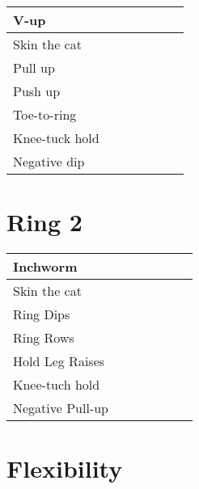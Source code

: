 \documentclass{article}
\begin{document}
\begin{landscape}
\noindent\begin{tabularx}{\columnwidth}{ |l|*{6}{R|} }
  \hline
  V-up                             &&&&&&    \\
  \hline
  Skin the cat                     &&&&&&    \\
  \hline
  Pull up                          &&&&&&    \\
  \hline
  Push up                          &&&&&&    \\
  \hline
  Toe-to-ring                      &&&&&&    \\
  \hline
  Knee-tuck hold                   &&&&&&    \\
  \hline
  Negative dip                     &&&&&&    \\
  \hline
\end{tabularx}



\section*{Ring 2}

\noindent\begin{tabularx}{\columnwidth}{ |l|*{6}{R|} }
  \hline
  Inchworm                         &&&&&&    \\
  \hline                                        
  Skin the cat                     &&&&&&    \\
  \hline                                        
  Ring Dips                        &&&&&&    \\
  \hline                                        
  Ring Rows                        &&&&&&    \\
  \hline                                        
  Hold Leg Raises                  &&&&&&    \\
  \hline                                        
  Knee-tuch hold                   &&&&&&    \\
  \hline                                        
  Negative Pull-up                 &&&&&&    \\
  \hline
\end{tabularx}


\renewcommand{\arraystretch}{3.5}

\section*{Flexibility}


\end{landscape}
\end{document}
